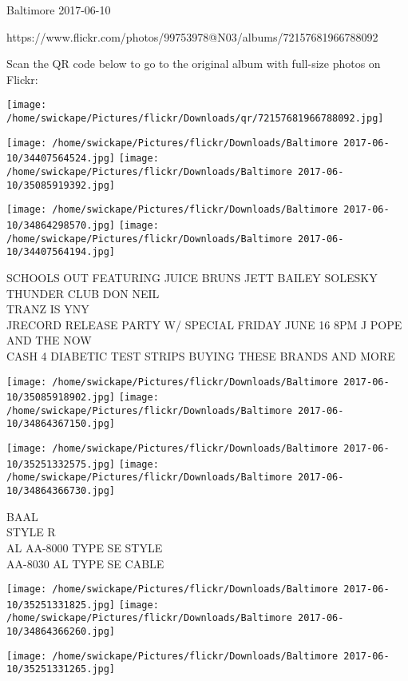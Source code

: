 \documentclass[10pt,letterpaper]{article}
\begin{document}
Baltimore 2017-06-10

https://www.flickr.com/photos/99753978@N03/albums/72157681966788092

Scan the QR code below to go to the original album with full-size photos on Flickr:

\texttt{[image: /home/swickape/Pictures/flickr/Downloads/qr/72157681966788092.jpg]}
\pagebreak

\texttt{[image: /home/swickape/Pictures/flickr/Downloads/Baltimore 2017-06-10/34407564524.jpg]}
\texttt{[image: /home/swickape/Pictures/flickr/Downloads/Baltimore 2017-06-10/35085919392.jpg]}

\texttt{[image: /home/swickape/Pictures/flickr/Downloads/Baltimore 2017-06-10/34864298570.jpg]}
\texttt{[image: /home/swickape/Pictures/flickr/Downloads/Baltimore 2017-06-10/34407564194.jpg]}

SCHOOLS OUT FEATURING JUICE BRUNS JETT BAILEY SOLESKY THUNDER CLUB DON NEIL\\
TRANZ IS YNY\\
JRECORD RELEASE PARTY W/ SPECIAL FRIDAY JUNE 16 8PM J POPE AND THE NOW\\
CASH 4 DIABETIC TEST STRIPS BUYING THESE BRANDS AND MORE\\
\pagebreak

\texttt{[image: /home/swickape/Pictures/flickr/Downloads/Baltimore 2017-06-10/35085918902.jpg]}
\texttt{[image: /home/swickape/Pictures/flickr/Downloads/Baltimore 2017-06-10/34864367150.jpg]}

\texttt{[image: /home/swickape/Pictures/flickr/Downloads/Baltimore 2017-06-10/35251332575.jpg]}
\texttt{[image: /home/swickape/Pictures/flickr/Downloads/Baltimore 2017-06-10/34864366730.jpg]}

BAAL\\
STYLE R\\
AL AA{-}8000 TYPE SE STYLE\\
AA{-}8030 AL TYPE SE CABLE\\
\pagebreak

\texttt{[image: /home/swickape/Pictures/flickr/Downloads/Baltimore 2017-06-10/35251331825.jpg]}
\texttt{[image: /home/swickape/Pictures/flickr/Downloads/Baltimore 2017-06-10/34864366260.jpg]}

\vspace{0.25in}
\texttt{[image: /home/swickape/Pictures/flickr/Downloads/Baltimore 2017-06-10/35251331265.jpg]}
\end{document}
